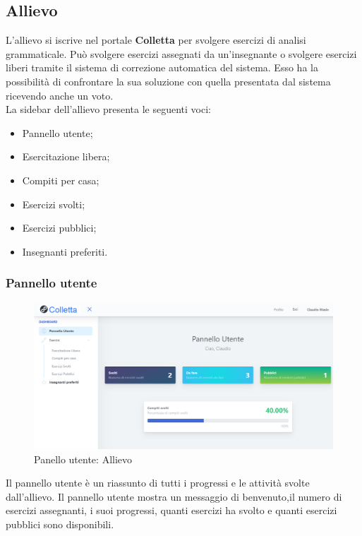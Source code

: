     \subsection{Allievo}
      L'allievo si iscrive nel portale \textbf{Colletta} per svolgere esercizi di analisi grammaticale. Può svolgere esercizi assegnati da un'insegnante o svolgere esercizi liberi tramite il sistema di correzione automatica del sistema. Esso ha la possibilità di confrontare la sua soluzione con quella presentata dal sistema ricevendo anche un voto.
      \\La sidebar dell'allievo presenta le seguenti voci:
            \begin{itemize}
                \item Pannello utente;
                \item Esercitazione libera;
                \item Compiti per casa;
                \item Esercizi svolti;
                \item Esercizi pubblici;
                \item Insegnanti preferiti.
            \end{itemize}
            

            
        \subsubsection{Pannello utente}
			\begin{figure}[H]
        		\centering
        		\includegraphics[width=1\linewidth]{sez/img/studente/panelloUtente.PNG} 
        		\caption{Panello utente: Allievo}\label{fig:1}
    		\end{figure}        
        
          Il pannello utente è un riassunto di tutti i progressi e le attività svolte dall'allievo. Il pannello utente mostra un messaggio di benvenuto,il numero di esercizi assegnanti, i suoi progressi, quanti esercizi ha svolto e quanti esercizi pubblici sono disponibili. 
          
